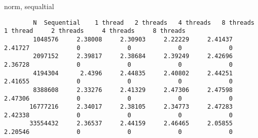 \documentclass[]{article}
\begin{document}
    norm, sequaltial
    \begin{lstlisting}
        N  Sequential    1 thread   2 threads   4 threads   8 threads      1 thread     2 threads     4 threads     8 threads
        1048576     2.38008     2.30903     2.22229     2.41437     2.41727             0             0             0             0
        2097152     2.39817     2.38684     2.39249     2.42696     2.36728             0             0             0             0
        4194304      2.4396     2.44835     2.40802     2.44251     2.41655             0             0             0             0
        8388608     2.33276     2.41329     2.47306     2.47598     2.47306             0             0             0             0
       16777216     2.34017     2.38105     2.34773     2.47283     2.42338             0             0             0             0
       33554432     2.36537     2.44159     2.46465     2.05855     2.20546             0             0             0             0   
    \end{lstlisting}
\end{document}
